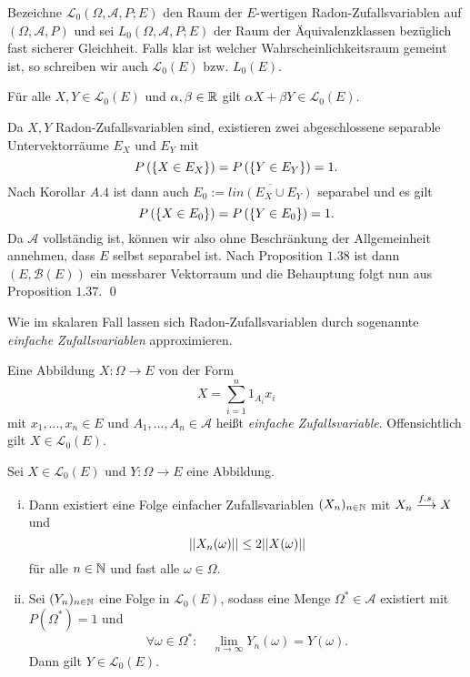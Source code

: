 Bezeichne $\mathcal{L}_0(\Omega, \mathcal{A}, P; E)$ den Raum der $E$-wertigen Radon-Zufallsvariablen auf $(\Omega,\mathcal{A},P)$ und sei $L_0(\Omega, \mathcal{A}, P;E)$ der Raum der Äquivalenzklassen bezüglich fast sicherer Gleichheit. 
Falls klar ist welcher Wahrscheinlichkeitsraum gemeint ist, so schreiben wir auch $\mathcal{L}_0(E)$ bzw. $L_0(E)$. 

\begin{proposition}
   Für alle $X,Y \in \mathcal{L}_0(E)$ und $\alpha, \beta \in \mathbb{R}$ gilt $\alpha X + \beta Y \in \mathcal{L}_0(E)$.
\end{proposition}

\begin{proof*}
    Da $X,Y$ Radon-Zufallsvariablen sind, existieren zwei abgeschlossene separable Untervektorräume $E_X$ und $E_Y$ mit 
    $$
        P\left(\left\{ X \in E_X \right\}\right) = P\left(\left\{ Y \in E_Y \right\}\right) = 1. 
    $$
    Nach Korollar $A.4$ ist dann auch $E_0 := \overline{lin(E_X \cup E_Y)}$ separabel und es gilt 
    $$
        P\left(\left\{ X \in E_0 \right\}\right) = P\left(\left\{ Y \in E_0 \right\}\right) = 1. 
    $$
    Da $\mathcal{A}$ vollständig ist, können wir also ohne Beschränkung der Allgemeinheit annehmen, dass $E$ selbst separabel ist. 
    Nach Proposition $1.38$ ist dann $(E, \mathcal{B}(E))$ ein messbarer Vektorraum und die Behauptung folgt nun aus Proposition $1.37$. \qed 
\end{proof*}

Wie im skalaren Fall lassen sich Radon-Zufallsvariablen durch sogenannte \textit{einfache Zufallsvariablen} approximieren. 

\begin{mydef}
    Eine Abbildung $X:\Omega \to E$ von der Form 
    $$
        X = \sum_{i=1}^n 1_{A_i}x_i
    $$
    mit $x_1,...,x_n \in E$ und $A_1,..., A_n \in \mathcal{A}$ heißt \textit{einfache Zufallsvariable}. Offensichtlich gilt \mbox{$X \in \mathcal{L}_0(E)$.} 
\end{mydef}


\begin{proposition}
    Sei $X \in \mathcal{L}_0(E)$ und $Y: \Omega \to E$ eine Abbildung. 
    \begin{enumerate}[(i)]
        \item Dann existiert eine Folge einfacher Zufallsvariablen $(X_n)_{n \in \mathbb{N}}$ mit $X_n \overset{f.s.}{\longrightarrow} X$ und 
        $$
            \lvert\lvert X_n(\omega) \rvert\rvert \leq 2 \lvert\lvert X(\omega) \rvert\rvert
        $$
        für alle $n \in \mathbb{N}$ und fast alle $\omega \in \Omega$. 
        \item Sei $(Y_n)_{n \in \mathbb{N}}$ eine Folge in $\mathcal{L}_0(E)$, sodass eine Menge $\Omega^* \in \mathcal{A}$ existiert mit $P(\Omega^*) = 1$ und 
        $$
            \forall \omega \in \Omega^*: \quad \lim_{n \to \infty}Y_n(\omega) = Y(\omega). 
        $$
        Dann gilt $Y \in \mathcal{L}_0(E)$. 
    \end{enumerate}
\end{proposition}

